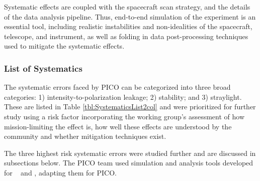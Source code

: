 \documentclass[PICOReport.tex]{subfiles}
\begin{document}
Systematic effects are coupled with the
spacecraft scan strategy, and the details of the 
data analysis pipeline.
Thus, end-to-end simulation of the experiment is an essential tool,
including realistic instabilities and non-idealities of the spacecraft,
telescope, and instrument, as well as folding in data post-processing techniques
used to mitigate the systematic effects.    

\subsubsection{List of Systematics}
The systematic errors faced by PICO can be categorized into three broad categories: 
1) intensity-to-polarization leakage; 2) stability; and 3) straylight. These are listed in Table \ref{tbl:SystematicsList2col} and were prioritized for further study using a risk factor incorporating the working group's assessment of how mission-limiting the effect is, how well these effects are understood by the community and whether mitigation techniques exist.  

The three highest risk systematic errors were studied further and are discussed in subsections below.  The PICO team used 
 simulation and analysis tools developed for \planck~\cite{plank2015_xii_focalplane} and \core, adapting them for PICO.

\end{document}

